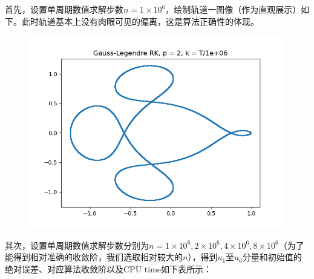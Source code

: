 \documentclass{ctexart}
\begin{document}
\begin{sloppypar}
首先，设置单周期数值求解步数$n = 1 \times 10^6$，绘制轨道一图像（作为直观展示）如下。此时轨道基本上没有肉眼可见的偏离，这是算法正确性的体现。
\begin{figure}[H]
\centering
\includegraphics[scale = 0.45]{./report_src/Figure_29.png}
\end{figure}
其次，设置单周期数值求解步数分别为$n = 1 \times 10^6,2 \times 10^6,4 \times 10^6, 8 \times 10^6$（为了能得到相对准确的收敛阶，我们选取相对较大的$n$），得到$u_1$至$u_6$分量和初始值的绝对误差、对应算法收敛阶以及CPU time如下表所示：


\end{sloppypar}
\end{document}
